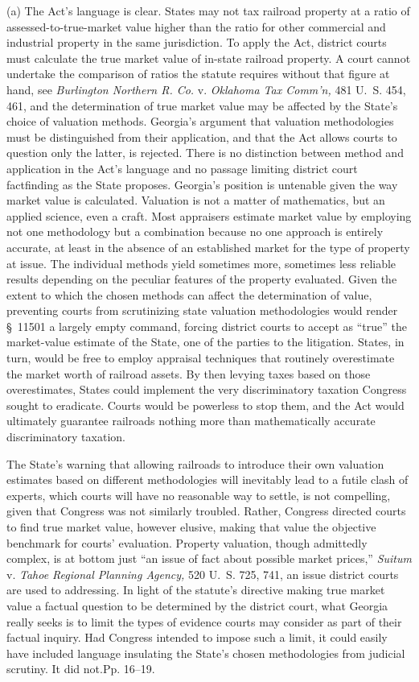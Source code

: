   (a) The Act's language is clear. States may not tax railroad
property at a ratio of assessed-to-true-market value higher than the
ratio for \newpage  other commercial and industrial property in the same
jurisdiction. To apply the Act, district courts must calculate the true
market value of in-state railroad property. A court cannot undertake
the comparison of ratios the statute requires without that figure at
hand, see \emph{Burlington Northern R. Co.} v. \emph{Oklahoma Tax Comm'n,}
481 U.~S. 454, 461, and the determination of true market value may
be affected by the State's choice of valuation methods. Georgia's
argument that valuation methodologies must be distinguished from their
application, and that the Act allows courts to question only the latter,
is rejected. There is no distinction between method and application in
the Act's language and no passage limiting district court factfinding
as the State proposes. Georgia's position is untenable given the way
market value is calculated. Valuation is not a matter of mathematics,
but an applied science, even a craft. Most appraisers estimate market
value by employing not one methodology but a combination because no one
approach is entirely accurate, at least in the absence of an established
market for the type of property at issue. The individual methods yield
sometimes more, sometimes less reliable results depending on the
peculiar features of the property evaluated. Given the extent to which
the chosen methods can affect the determination of value, preventing
courts from scrutinizing state valuation methodologies would render
\S~11501 a largely empty command, forcing district courts to accept as
``true'' the market-value estimate of the State, one of the parties
to the litigation. States, in turn, would be free to employ appraisal
techniques that routinely overestimate the market worth of railroad
assets. By then levying taxes based on those overestimates, States
could implement the very discriminatory taxation Congress sought to
eradicate. Courts would be powerless to stop them, and the Act would
ultimately guarantee railroads nothing more than mathematically accurate
discriminatory taxation.

  The State's warning that allowing railroads to introduce their own
valuation estimates based on different methodologies will inevitably
lead to a futile clash of experts, which courts will have no reasonable
way to settle, is not compelling, given that Congress was not similarly
troubled. Rather, Congress directed courts to find true market value,
however elusive, making that value the objective benchmark for courts'
evaluation. Property valuation, though admittedly complex, is at bottom
just ``an issue of fact about possible market prices,'' \emph{Suitum}
v. \emph{Tahoe Regional Planning Agency,} 520 U.~S. 725, 741, an issue
district courts are used to addressing. In light of the statute's
directive making true market value a factual question to be determined
by the district court, what Georgia really seeks is to limit the types
of evidence courts may consider as part of their factual inquiry. Had
Congress intended to impose such a limit, it could easily have included
language insulating \newpage  the State's chosen methodologies from
judicial scrutiny. It did not.Pp. 16--19.

